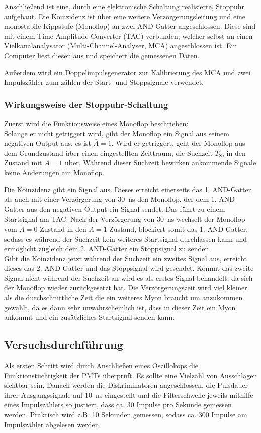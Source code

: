         Anschließend ist eine, durch eine elektronische Schaltung realisierte, Stoppuhr aufgebaut. Die Koinzidenz ist über eine weitere Verzörgerungsleitung und eine monostabile Kippstufe (Monoflop) an zwei AND-Gatter angeschlossen. Diese sind mit einem Time-Amplitude-Converter (TAC) verbunden, welcher selbst an einen Vielkanalanalysator (Multi-Channel-Analyser, MCA) angeschlossen ist. Ein Computer liest diesen aus und speichert die gemessenen Daten.

        Außerdem wird ein Doppelimpulsgenerator zur Kalibrierung des MCA und zwei Impulszähler zum zählen der Start- und Stoppsignale verwendet.

    \subsubsection*{Wirkungsweise der Stoppuhr-Schaltung}
        Zuerst wird die Funktionsweise eines Monoflop beschrieben: \\
        Solange er nicht getriggert wird, gibt der Monoflop ein Signal aus seinem negativen Output aus, es ist $\bar{A} = 1$.
        Wird er getriggert, geht der Monoflop aus dem Grundzustand über einen eingestellten Zeittraum, die Suchzeit $T_{\text{S}}$, in den Zustand mit $A = 1$ über.
        Während dieser Suchzeit bewirken ankommende Signale keine Änderungen am Monoflop.

        Die Koinzidenz gibt ein Signal aus. Dieses erreicht einerseits das 1. AND-Gatter, als auch mit einer Verzörgerung von \SI{30}{ns} den Monoflop, der dem 1. AND-Gatter aus den negativen Output ein Signal sendet. Das führt zu einem Startsignal am TAC. Nach der Verzörgerung von \SI{30}{ns} wechselt der Monoflop vom $A=0$ Zustand in den $A=1$ Zustand, blockiert somit das 1. AND-Gatter, sodass es während der Suchzeit kein weiteres Startsignal durchlassen kann und ermöglicht zugleich dem 2. AND-Gatter ein Stoppsignal zu senden. \\
        Gibt die Koinzidenz jetzt während der Suchzeit ein zweites Signal aus, erreicht dieses das 2. AND-Gatter und das Stoppsignal wird gesendet. Kommt das zweite Signal nicht während der Suchzeit an wird es als erstes Signal behandelt, da sich der Monoflop wieder zurückgesetzt hat. Die Verzörgerungszeit wird viel kleiner als die durchschnittliche Zeit die ein weiteres Myon braucht um anzukommen gewählt, da es dann sehr unwahrscheinlich ist, dass in dieser Zeit ein Myon ankommt und ein zusätzliches Startsignal senden kann.

    \subsection{Versuchsdurchführung}
        Als ersten Schritt wird durch Anschließen eines Oszillokops die Funktionstüchtigkeit der PMTs überprüft. Es sollte eine Vielzahl von Ausschlägen sichtbar sein. Danach werden die Diskriminatoren angeschlossen, die Pulsdauer ihrer Ausgangssignale auf \SI{10}{\nano \second} eingestellt und die Filterschwelle jeweils mithilfe eines Impulszählers so justiert, dass ca. 30 Impulse pro Sekunde gemessen werden. Praktisch wird z.B. 10 Sekunden gemessen, sodass ca. 300 Impulse am Impulszähler abgelesen werden.

